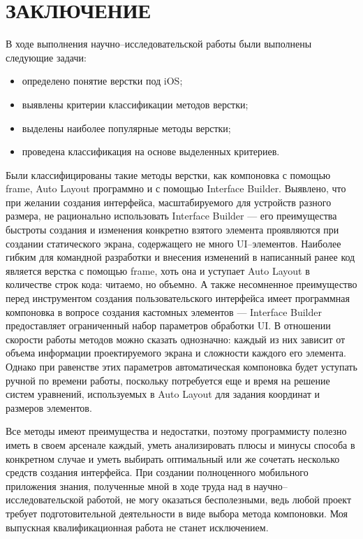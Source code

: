 \section*{ЗАКЛЮЧЕНИЕ}

В ходе выполнения научно--исследовательской работы были выполнены следующие задачи: 

\begin{itemize}[label=---]
	\item определено понятие верстки под iOS;
	\item выявлены критерии классификации методов верстки;
	\item выделены наиболее популярные методы верстки;
	\item проведена классификация на основе выделенных критериев.	
\end{itemize}

Были классифицированы такие методы верстки, как компоновка с помощью frame, Auto Layout программно и с помощью Interface Builder. 
Выявлено, что при желании создания интерфейса, масштабируемого для устройств разного размера, не рационально использовать Interface Builder --- его преимущества быстроты создания и изменения конкретно взятого элемента проявляются при создании статического экрана, содержащего не много UI--элементов. 
Наиболее гибким для командной разработки и внесения изменений в написанный ранее код является верстка с помощью frame, хоть она и уступает Auto Layout в количестве строк кода: читаемо, но объемно. 
А также несомненное преимущество перед инструментом создания пользовательского интерфейса имеет программная компоновка в вопросе создания кастомных элементов --- Interface Builder предоставляет ограниченный набор параметров обработки UI. 
В отношении скорости работы методов можно сказать однозначно: каждый из них зависит от объема информации проектируемого экрана и сложности каждого его элемента. 
Однако при равенстве этих параметров автоматическая компоновка будет уступать ручной по времени работы, поскольку потребуется еще и время на решение систем уравнений, используемых в Auto Layout для задания координат и размеров элементов. 

Все методы имеют преимущества и недостатки, поэтому программисту полезно иметь в своем арсенале каждый, уметь анализировать плюсы и минусы способа в конкретном случае и уметь выбирать оптимальный или же сочетать несколько средств создания интерфейса. При создании полноценного мобильного приложения знания, полученные мной в ходе труда над в научно--исследовательской работой, не могу оказаться бесполезными, ведь любой проект требует подготовительной деятельности в виде выбора метода компоновки. Моя выпускная квалификационная работа не станет исключением.

\pagebreak